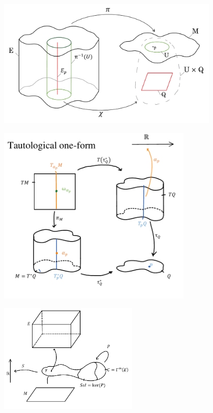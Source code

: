 \documentclass[Main]{subfiles}
\begin{document}
	\includegraphics[width=0.8\textwidth]{Pictures/fiberbundle}		
 
 	\includegraphics[width=0.7\textwidth]{Pictures/Tautological1Form} 

	\includegraphics[width=0.5\textwidth]{Pictures/AbstractFieldTheory} 
\end{document}
